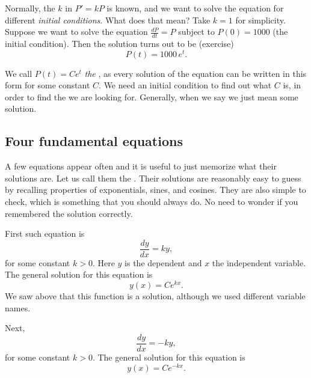 Normally, the $k$ in $P' = kP$ is known,
and we want to solve
the equation for different \emph{initial conditions}.
What does that mean?
Take $k=1$ for simplicity.  Suppose we want to solve the equation
$\frac{dP}{dt} = P$ 
subject to $P(0) = 1000$ (the initial condition).
Then the solution turns out to be (exercise)
\begin{equation*}
P(t) = 1000 \, e^t .
\end{equation*}

We call $P(t) = C e^t$ \emph{the },
as every solution
of the equation can be written in this form for some constant $C$.  We
need an initial condition to find out what $C$ is, in order to find the
\emph{} we are looking for.  Generally, when we say
 we just mean some solution.

\subsection{Four fundamental equations} \label{subsection:fourfundamental}

A few equations appear often and
it is useful to just memorize what
their solutions are.
Let us call them the .
Their solutions
are reasonably easy
to guess by recalling properties of exponentials, sines, and cosines.
They are also simple to check, which is something that you should always do.
No need to wonder if you remembered the solution correctly.

\medskip

First such equation is
\begin{equation*}
\frac{dy}{dx} = k y ,
\end{equation*}
for some constant $k > 0$.
Here $y$ is the dependent and $x$ the independent variable.
The general solution for this equation is
\begin{equation*}
y(x) = C e^{kx} .
\end{equation*}
We saw above that this function is a solution, although we used different
variable names.

\medskip

Next,
\begin{equation*}
\frac{dy}{dx} = -k y ,
\end{equation*}
for some constant $k > 0$.
The general solution for this equation is
\begin{equation*}
y(x) = C e^{-kx} .
\end{equation*}

